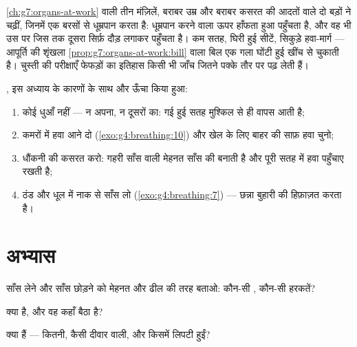 \begin{example}[सीढ़ी की दो परीक्षाएँ]\label{ex:g7:lungs-and-gas-exchange:stairs}
\cref{ch:g7:organs-at-work} वाली तीन मंज़िलें, बराबर उम्र और बराबर
कसरत की आदतों वाले दो बड़ों ने चढ़ीं, जिनमें एक बरसों से धूम्रपान करता
है: धूम्रपान करने वाला ऊपर हाँफता हुआ पहुँचता है, और वह भी उस  पर
जिस तक दूसरा सिर्फ़ दौड़ लगाकर पहुँचता है। कम सतह, घिरी हुई सीटें,
सिकुड़े हवा-मार्ग --- आपूर्ति की शृंखला
\cref{prop:g7:organs-at-work:bill} वाला बिल एक गला घोंटी हुई खींच से
चुकाती है। चुस्ती की परीक्षाएँ फेफड़ों का इतिहास किसी भी जाँच जितने
पक्के तौर पर पढ़ लेती हैं।
\end{example}

\begin{method}[मशीनरी सँभालना]\label{met:g7:lungs-and-gas-exchange:keep}
, इस अध्याय के कारणों के साथ और ऊँचा किया
हुआ:
\begin{enumerate}
  \item कोई धुआँ नहीं --- न अपना, न दूसरों का: गई हुई सतह मुश्किल से
        ही वापस आती है;
  \item कमरों में हवा आने दो (\cref{exo:g4:breathing:10}) और खेल के
        लिए बाहर की साफ़ हवा चुनो;
  \item धौंकनी की कसरत करो: गहरी साँस वाली मेहनत साँस की 
        बनाती है और पूरी सतह में हवा पहुँचाए रखती है;
  \item ठंड और धूल में नाक से साँस लो (\cref{exo:g4:breathing:7})
        --- छन्ना बुहारी की हिफ़ाज़त करता है।
\end{enumerate}
\end{method}

\section{अभ्यास}

\begin{exercise}[$\star$]\label{exo:g7:lungs-and-gas-exchange:1}
साँस लेने और साँस छोड़ने को मेहनत और ढील की तरह बताओ: कौन-सी ,
कौन-सी हरकतें?
\end{exercise}

\begin{exercise}[$\star$]\label{exo:g7:lungs-and-gas-exchange:2}
 क्या है, और वह कहाँ बैठा है?
\end{exercise}

\begin{exercise}[$\star$]\label{exo:g7:lungs-and-gas-exchange:3}
 क्या हैं --- कितनी, कैसी दीवार वाली, और किसमें लिपटी हुईं?
\end{exercise}

